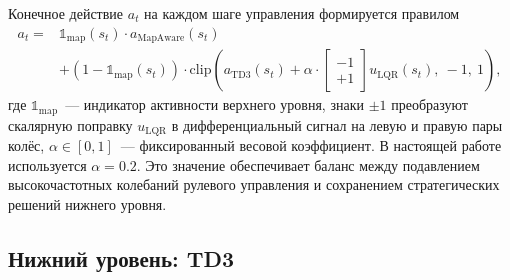 \documentclass[11pt]{article}
\begin{document}
Конечное действие $a_t$ на каждом шаге управления формируется правилом
\begin{equation}
\label{eq:combine}
\begin{split}
a_t = {} & \mathbb{1}_{\mathrm{map}}(s_t) \cdot a_{\mathrm{MapAware}}(s_t) \\
& + (1 - \mathbb{1}_{\mathrm{map}}(s_t)) \cdot \mathrm{clip}\left( a_{\mathrm{TD3}}(s_t) + \alpha \cdot \begin{bmatrix} -1 \\ +1 \end{bmatrix} u_{\mathrm{LQR}}(s_t),\ -1,\ 1 \right),
\end{split}
\end{equation}
где $\mathbb{1}_{\text{map}}$~--- индикатор активности верхнего уровня,
знаки $\pm 1$ преобразуют скалярную поправку $u_{\mathrm{LQR}}$
в дифференциальный сигнал на левую и правую пары колёс, $\alpha \in [0, 1]$~---
фиксированный весовой коэффициент. В настоящей работе используется
$\alpha = 0.2$. Это значение обеспечивает баланс между подавлением
высокочастотных колебаний рулевого управления и сохранением стратегических
решений нижнего уровня.


\subsection{Нижний уровень: TD3}
\label{sec:reactive}
\end{document}
